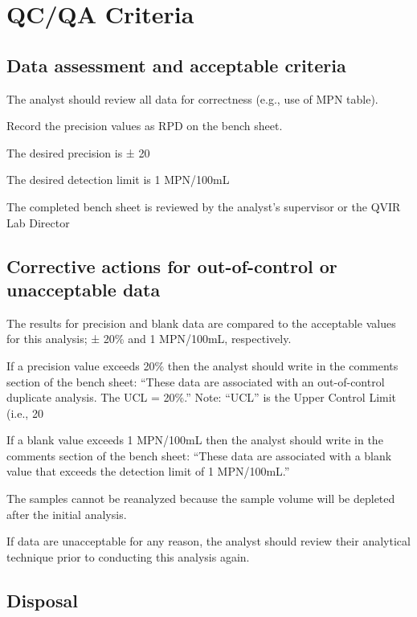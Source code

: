\documentclass[12pt]{../SOP4_alpha}\usepackage[]{graphicx}\usepackage[]{xcolor}
\begin{document}
\section{QC/QA Criteria}

\subsection{Data assessment and acceptable criteria}

\NP The analyst should review all data for correctness (e.g., use of MPN table).


\NP Record the precision values as RPD on the bench sheet.

\NP The desired precision is ± 20%

\NP The desired detection limit is 1 MPN/100mL

\NP The completed bench sheet is reviewed by the analyst's supervisor or the
QVIR Lab Director 


\subsection{Corrective actions for out-of-control or unacceptable data}

\NP The results for precision and blank data are compared to the
acceptable values for this analysis; ± 20\% and 1 MPN/100mL,
respectively.

\NP If a precision value exceeds 20\% then the analyst should write in the
comments section of the bench sheet: “These data are associated
with an out-of-control duplicate analysis. The UCL = 20\%.” Note:
“UCL” is the Upper Control Limit (i.e., 20%

\NP If a blank value exceeds 1 MPN/100mL then the analyst should write
in the comments section of the bench sheet: “These data are
associated with a blank value that exceeds the detection limit of 1
MPN/100mL.”

\NP The samples cannot be reanalyzed because the sample volume will be
depleted after the initial analysis.

\NP  If data are unacceptable for any reason, the analyst should review
their analytical technique prior to conducting this analysis again. 

\subsection{Disposal}
\end{document}
